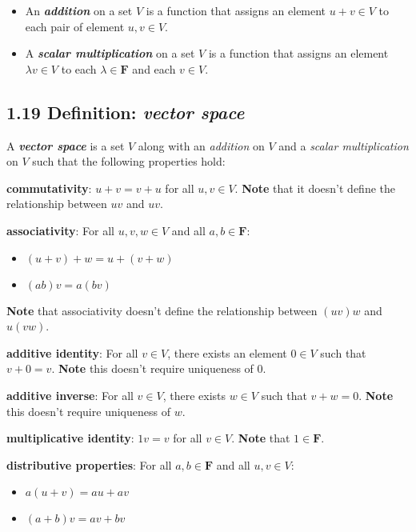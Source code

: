 \documentclass[12pt, letterpaper, oneside]{book}
\begin{document}
\begin{itemize}
  \item An \textbf{\textit{addition}} on a set $V$ is a function that assigns
    an element $u+v \in V$ to each pair of element $u, v \in V$.
  \item A \textbf{\textit{scalar multiplication}} on a set $V$ is a function
    that assigns an element $\lambda v \in V$ to each $\lambda \in \mathbf{F}$
    and each $v \in V$.
\end{itemize}

\subsection{1.19 Definition: \textbf{\textit{vector space}}}

A \textbf{\textit{vector space}} is a set $V$ along with an \textit{addition}
on $V$ and a \textit{scalar multiplication} on $V$ such that the following
properties hold:

\textbf{commutativity}: $u + v = v + u$ for all $u, v \in V$. \textbf{Note}
that it doesn't define the relationship between $uv$ and $uv$.

\textbf{associativity}: For all $u, v, w \in V$ and all $a, b \in \mathbf{F}$:
\begin{itemize}
  \item $(u + v) + w = u + (v + w)$
  \item $(ab)v = a(bv)$
\end{itemize}

\textbf{Note} that associativity doesn't define the relationship between
$(uv)w$ and $u(vw)$.

\textbf{additive identity}: For all $v \in V$, there exists an element $0 \in V$
such that $v + 0 = v$. \textbf{Note} this doesn't require uniqueness of $0$.

\textbf{additive inverse}: For all $v \in V$, there exists $w \in V$ such that
$v + w = 0$. \textbf{Note} this doesn't require uniqueness of $w$.

\textbf{multiplicative identity}: $1v = v$ for all $v \in V$. \textbf{Note}
  that $1 \in \mathbf{F}$.

\textbf{distributive properties}: For all $a, b \in \mathbf{F}$ and all $u, v
\in V$:
\begin{itemize}
  \item $a(u + v) = au + av$
  \item $(a + b)v = av + bv$
\end{itemize}
\end{document}
